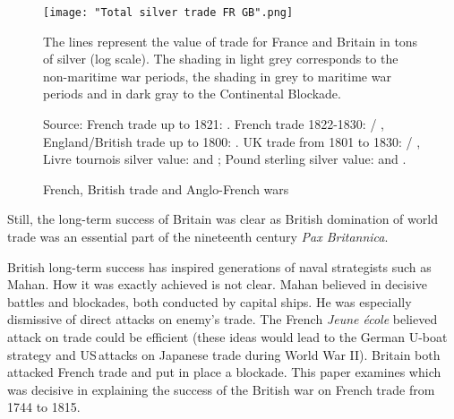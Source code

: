 \documentclass[12pt,a4paper,notitlepage,english]{article}
\newcommand{\fontsmall}{\fontsize{10pt}{12pt}\selectfont}
\newcommand{\source}[1]{\caption*{\footnotesize Source: {#1}} }
\begin{document}
\begin{figure}[h!]
	\caption{French, British trade and Anglo-French wars}\label{FrBritTrade}
	\centering
	\texttt{[image: "Total silver trade FR GB".png]}
	\begin{minipage}{18cm}
		\begin{flushleft}
			\fontsmall
			The lines represent the value of trade for France and Britain in tons of silver (log scale). The shading in light grey corresponds to the non-maritime war periods, the shading in grey to maritime war periods and in dark gray to the Continental Blockade.
			\source{French trade up to 1821: \cite{Daudin2020}. French trade 1822-1830: \cite{Federico2016} / \cite{Dedinger2017},
				England/British trade up to 1800: \cite{Deane1969}. UK trade from 1801 to 1830: \cite{Federico2016} / \cite{Dedinger2017},
				Livre tournois silver value: \cite{Dewailly1857} and \cite{Hoffman2000}; Pound sterling silver value: \cite{Clark2006} and \cite{Jastram1981}. }
		\end{flushleft}
	\end{minipage}
\end{figure}


Still, the long-term success of Britain was clear as British domination of world trade was an essential part of the nineteenth century \emph{Pax Britannica}.

British long-term success has inspired generations of naval strategists such as Mahan.
How it was exactly achieved is not clear.
Mahan believed in decisive battles and blockades, both conducted by capital ships.
He was especially dismissive of direct attacks on enemy's trade.
The French \textit{Jeune école} believed attack on trade could be efficient \cite{Aube1882} (these ideas would lead to the German U-boat strategy and US attacks on Japanese trade during World War II).
Britain both attacked French trade and put in place a blockade.
This paper examines which was decisive in explaining the success of the British war on French trade from 1744 to 1815.
 
\end{document}
